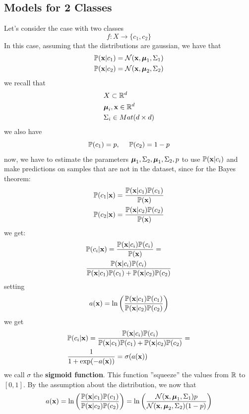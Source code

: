 \documentclass[10pt, letterpaper]{report}
\begin{document}
\subsection{Models for 2 Classes}
Let's consider the case with two classes
$$
	f:X\rightarrow\{c_1,c_2\}
$$
In this case, assuming that the distributions are gaussian, we have that\begin{align}
	 & {\mathbb P}(\mathbf x|c_1)=\mathcal N(\mathbf x,{\boldsymbol{\mu}}_1,\Sigma_1) \\
	 & {\mathbb P}(\mathbf x|c_2)=\mathcal N(\mathbf x,{\boldsymbol{\mu}}_2,\Sigma_2)
\end{align}
we recall that\begin{align}
	 & X\subset {\mathbb R}^d              \\
	 & {\boldsymbol{\mu}}_i,\mathbf x\in{\mathbb R}^d    \\
	 & \Sigma_i\in Mat(d\times d)
\end{align}
we also have\begin{equation}
	{\mathbb P}(c_1)=p,  \ \ \ \ {\mathbb P}(c_2)=1-p
\end{equation}
now, we have to estimate the parameters ${\boldsymbol{\mu}}_1,\Sigma_2,{\boldsymbol{\mu}}_1,\Sigma_2,p$ to use ${\mathbb P}(\mathbf x|c_i)$ and make predictions on samples that are not in the dataset, since for the Bayes theorem:\begin{align}
	 & {\mathbb P}(c_1|\mathbf x)=\frac{{\mathbb P}(\mathbf x|c_1){\mathbb P}(c_1)}{{\mathbb P}(\mathbf x)} \\
	 & {\mathbb P}(c_2|\mathbf x)=\frac{{\mathbb P}(\mathbf x|c_2){\mathbb P}(c_2)}{{\mathbb P}(\mathbf x)}
\end{align}
we get:\begin{align}
	 & {\mathbb P}(c_i|\mathbf x)=\frac{{\mathbb P}(\mathbf x|c_i){\mathbb P}(c_i)}{{\mathbb P}(\mathbf x)}=                        \\
	 & \frac{{\mathbb P}(\mathbf x|c_i){\mathbb P}(c_i)}{{\mathbb P}(\mathbf x|c_1){\mathbb P}(c_1)+{\mathbb P}(\mathbf x|c_2){\mathbb P}(c_2)}
\end{align}
setting
\begin{equation}
	a(\mathbf x)=\ln\left(\frac{{\mathbb P}(\mathbf x|c_1){\mathbb P}(c_1)}{{\mathbb P}(\mathbf x|c_2){\mathbb P}(c_2)}\right)
\end{equation}
we get\begin{align}
	 & {\mathbb P}(c_i|\mathbf x)=\frac{{\mathbb P}(\mathbf x|c_i){\mathbb P}(c_i)}{{\mathbb P}(\mathbf x|c_1){\mathbb P}(c_1)+{\mathbb P}(\mathbf x|c_2){\mathbb P}(c_2)}= \\
	 & \frac{1}{1+\exp(-a(\mathbf x))}=\sigma(a(\mathbf x))
\end{align}
we call  $\sigma$ the \textbf{sigmoid function}. This function ''squeeze'' the values from ${\mathbb R}$ to $[0,1]$. By the assumption about the distribution, we now that\begin{equation}
	a(\mathbf x)=\ln\left(\frac{{\mathbb P}(\mathbf x|c_1){\mathbb P}(c_1)}{{\mathbb P}(\mathbf x|c_2){\mathbb P}(c_2)}\right)=
	\ln\left(\frac{\mathcal N(\mathbf x,{\boldsymbol{\mu}}_1,\Sigma_1)p}{\mathcal N(\mathbf x,{\boldsymbol{\mu}}_2,\Sigma_2)(1-p)}\right)
\end{equation}
\end{document}
